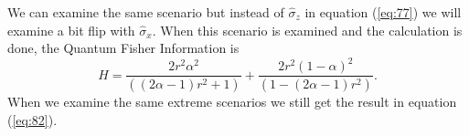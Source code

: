 \documentclass[twocolumn]{article}
\begin{document}
We can examine the same scenario but instead of $\hat{\sigma}_z$ in equation (\ref{eq:77}) we will examine a bit flip with $\hat{\sigma}_x$. When this scenario is examined and the calculation is done, the Quantum Fisher Information is
\begin{equation}\label{eq:91}
H=\frac{2r^2\alpha^2}{((2\alpha-1)r^2+1)}+\frac{2r^2(1-\alpha)^2}{(1-(2\alpha-1)r^2)}.
\end{equation}
When we examine the same extreme scenarios we still get the result in equation (\ref{eq:82}).
\end{document}
